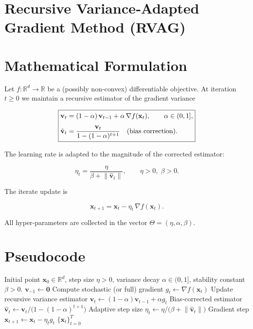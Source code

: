 \documentclass{article}
\newcommand{\norm}[1]{\left\|#1\right\|}
\newcommand{\grad}{\nabla}
\begin{document}
\section*{Recursive Variance‑Adapted Gradient Method (RVAG)}

\section*{Mathematical Formulation}
Let $f:\mathbb{R}^d\rightarrow\mathbb{R}$ be a (possibly non‑convex) differentiable objective.  
At iteration $t\ge 0$ we maintain a recursive estimator of the gradient variance

\[
\boxed{%
\begin{aligned}
\mathbf{v}_t &= (1-\alpha)\,\mathbf{v}_{t-1}+\alpha\,\grad f(\mathbf{x}_t),\qquad 
\alpha\in(0,1],\\[4pt]
\hat{\mathbf{v}}_t &= \frac{\mathbf{v}_t}{1-(1-\alpha)^{t+1}}\quad\text{(bias correction)} .
\end{aligned}}
\]

The learning rate is adapted to the magnitude of the corrected estimator:

\[
\eta_t = \frac{\eta}{\beta + \norm{\hat{\mathbf{v}}_t}},\qquad 
\eta>0,\;\beta>0 .
\]

The iterate update is

\[
\boxed{\mathbf{x}_{t+1}= \mathbf{x}_t - \eta_t\,\grad f(\mathbf{x}_t)} .
\]

All hyper‑parameters are collected in the vector
$\Theta=(\eta,\alpha,\beta)$.  

\section*{Pseudocode}
\begin{algorithm}[H]
\caption{Recursive Variance‑Adapted Gradient (RVAG)}
\begin{algorithmic}[1]
\Require Initial point $\mathbf{x}_0\in\mathbb{R}^d$, step size $\eta>0$, 
variance decay $\alpha\in(0,1]$, stability constant $\beta>0$.
\State $\mathbf{v}_{-1}\gets \mathbf{0}$ 
    \State Compute stochastic (or full) gradient $g_t \gets \grad f(\mathbf{x}_t)$
    \State Update recursive variance estimator 
          $\mathbf{v}_t \gets (1-\alpha)\mathbf{v}_{t-1}+ \alpha g_t$ \label{line:update_v}
    \State Bias‑corrected estimator 
          $\hat{\mathbf{v}}_t \gets \mathbf{v}_t / \bigl(1-(1-\alpha)^{t+1}\bigr)$
    \State Adaptive step size 
          $\eta_t \gets \eta / \bigl(\beta + \norm{\hat{\mathbf{v}}_t}\bigr)$
    \State Gradient step 
          $\mathbf{x}_{t+1} \gets \mathbf{x}_t - \eta_t g_t$
\EndFor
\State \Return $\{\mathbf{x}_t\}_{t=0}^{T}$
\end{algorithmic}
\end{algorithm}
\end{document}
